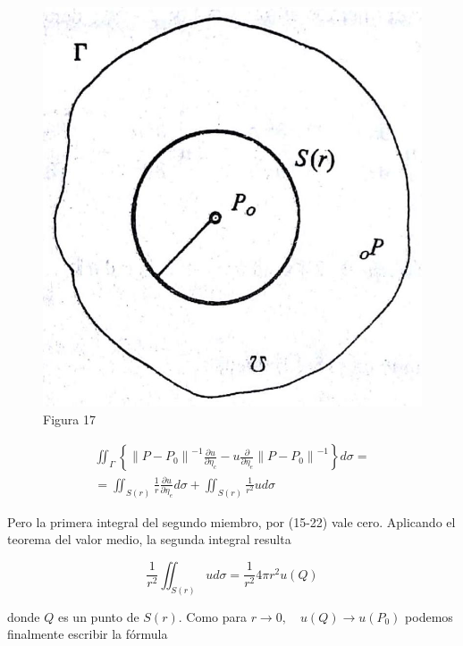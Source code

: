 \documentclass[10pt]{article}
\theoremstyle{plain}
\theoremstyle{definition}
\theoremstyle{remark}
\begin{document}
\begin{figure}[h]
\begin{center}
  \includegraphics[width=\textwidth]{2025_09_05_adecef5eb2053bc129b5g-363}
\captionsetup{labelformat=empty}
\caption{Figura 17}
\end{center}
\end{figure}

$$
\begin{gathered}
\iint_{\Gamma}\left\{\left\|P-P_{0}\right\|^{-1} \frac{\partial u}{\partial \eta_{c}}-u \frac{\partial}{\partial \eta_{e}}\left\|P-P_{0}\right\|^{-1}\right\} d \sigma= \\
=\iint_{S(r)} \frac{1}{r} \frac{\partial u}{\partial \eta_{e}} d \sigma+\iint_{S(r)} \frac{1}{r^{2}} u d \sigma
\end{gathered}
$$

Pero la primera integral del segundo miembro, por (15-22) vale cero. Aplicando el teorema del valor medio, la segunda integral resulta

$$
\frac{1}{r^{2}} \iint_{S(r)} u d \sigma=\frac{1}{r^{2}} 4 \pi r^{2} u(Q)
$$

donde $Q$ es un punto de $S(r)$. Como para $r \rightarrow 0, \quad u(Q) \rightarrow u\left(P_{0}\right)$ podemos finalmente escribir la fórmula
\end{document}
